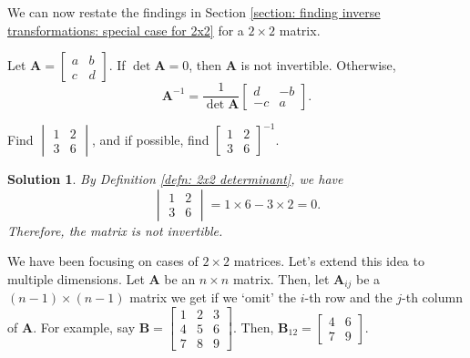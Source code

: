 \documentclass[]{book}
\newcommand{\inv}[1]{\ensuremath{{#1}^{-1}}}
\newcommand{\invm}[1]{\ensuremath{\inv{\mat{#1}}}}
\newcommand{\mat}[1]{\ensuremath{\mathbf{#1}}}
\newtheorem*{solution}{Solution}
\begin{document}
We can now restate the findings in Section \ref{section: finding inverse transformations: special case for 2x2} for a $2 \times 2$ matrix.

\begin{theorem}
    \label{thm: formula for 2x2 inverse}
    Let $\mat{A} = \begin{bmatrix}a & b \\ c & d \end{bmatrix}$. If $\det\mat{A} = 0$, then $\mat{A}$ is not invertible. Otherwise, 
    \[\invm{A} = \frac{1}{\det\mat{A}}\begin{bmatrix}d & -b \\ -c & a\end{bmatrix}.\]
\end{theorem}

\begin{example}
    \label{expl: 2x2 inverse using determinant 2}
    Find $\begin{vmatrix} 1 & 2 \\ 3 & 6 \end{vmatrix}$, and if possible, find $\begin{bmatrix} 1 & 2 \\ 3 & 6 \end{bmatrix}^{-1}$.
\begin{solution}
    By Definition \ref{defn: 2x2 determinant}, we have
    \[\begin{vmatrix} 1 & 2 \\ 3 & 6 \end{vmatrix} = 1 \times 6 - 3 \times 2 = 0.\]
    Therefore, the matrix is not invertible.
    \hfill \qedsymbol
\end{solution}
\end{example}

We have been focusing on cases of $2 \times 2$ matrices. Let's extend this idea to multiple dimensions. Let $\mat{A}$ be an $n \times n$ matrix. Then, let $\mat{A}_{ij}$ be a $(n-1) \times (n-1)$ matrix we get if we `omit' the $i$-th row and the $j$-th column of $\mat{A}$. For example, say $\mat{B}=\begin{bmatrix} 1 & 2 & 3 \\ 4 & 5 & 6 \\ 7 & 8 & 9 \end{bmatrix}$. Then, $\mat{B}_{12} = \begin{bmatrix}4 & 6 \\ 7 & 9\end{bmatrix}$.
\end{document}
